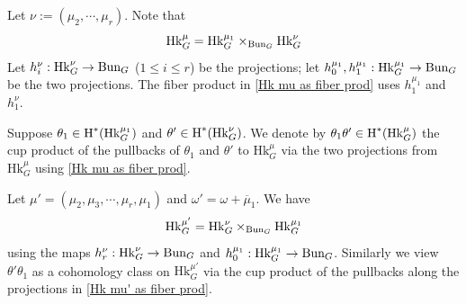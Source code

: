 \documentclass[reqno]{amsart}
\numberwithin{equation}{subsection}
\theoremstyle{definition}
\newcommand{\Bun}{\textup{Bun}}
\newcommand\Hk{\mathrm{Hk}}
\newcommand{\cohog}[2]{\textup{H}^{#1}({#2})}     %
\renewcommand{\th}{\theta}
\newcommand{\om}{\omega}
\newcommand{\ol}[1]{\overline{#1}}
\begin{document}
Let $\nu :=(\mu_2,\cdots, \mu_r)$. Note that
\begin{equation}\label{Hk mu as fiber prod}
    \Hk^\mu_G=\Hk^{\mu_1}_G\times_{\Bun_G}\Hk^\nu_G
\end{equation}
Let $h_i^\nu: \Hk^\nu_G\to \Bun_G$ ($1\le i\le r$) be the projections; let $h^{\mu_1}_0, h^{\mu_1}_1: \Hk^{\mu_1}_G\to\Bun_G$ be the two projections. The fiber product in \eqref{Hk mu as fiber prod} uses $h^{\mu_1}_1$ and $h^\nu_1$.

Suppose $\th_1\in \cohog{*}{\Hk^{\mu_1}_G}$ and $\th'\in \cohog{*}{\Hk^\nu_G}$. We denote by $\th_1\th'\in \cohog{*}{\Hk^\mu_G}$ the cup product of the pullbacks of $\th_1$ and $\th'$ to $\Hk^\mu_G$ via the two projections from $\Hk^\mu_G$ using \eqref{Hk mu as fiber prod}.


Let $\mu'=(\mu_2,\mu_3,\cdots, \mu_r,\mu_1)$ and $\om'=\om+\ol \mu_1$. We have
\begin{equation}\label{Hk mu' as fiber prod}
    \Hk^{\mu'}_G=\Hk^{\nu}_G\times_{\Bun_G}\Hk^{\mu_1}_G
\end{equation}
using the maps $h_r^\nu: \Hk^{\nu}_G\to \Bun_G$ and $h^{\mu_1}_0: \Hk^{\mu_1}_G\to\Bun_G$. Similarly we view $\th'\th_1$ as a cohomology class on $\Hk^{\mu'}_G$ via the cup product of the pullbacks along the projections in \eqref{Hk mu' as fiber prod}.
\end{document}
